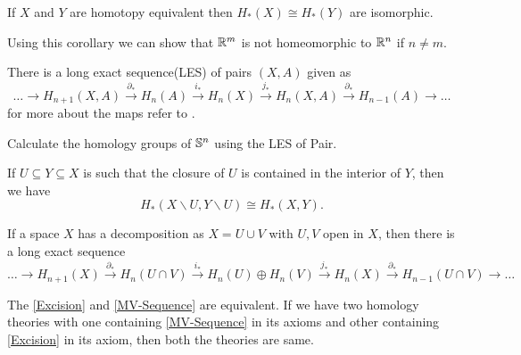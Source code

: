 \begin{corollary}
	If \(X\) and \(Y\) are homotopy equivalent then \(H_\ast(X) \cong H_\ast(Y)\) are isomorphic.
\end{corollary}
Using this corollary we can show that \(\mathbb{R}^{m}\) is not homeomorphic to \(\mathbb{R}^{n}\) if \(n \neq m\).

\begin{theorem}
	There is a long exact sequence(LES) of pairs \((X,A)\) given as 
	\[\dots \to H_{n+1}(X,A) \xrightarrow{\partial_\ast} H_n(A) \xrightarrow{i_\ast} H_n(X) \xrightarrow{j_\ast} H_n(X,A) \xrightarrow{\partial_\ast} H_{n-1}(A) \to \dots\]
	for more about the maps refer to \cite{Hatcher2002}.
\end{theorem}

\begin{exercise}
	Calculate the homology groups of \(\mathbb{S}^{n}\) using the LES of Pair. 
\end{exercise}

\begin{theorem}
	\label{Excision}
	If \(U \subseteq Y \subseteq X\) is such that the closure of \(U\) is contained in the interior of \(Y\), then we have 
	\[H_\ast(X\backslash U,Y \backslash U) \cong H_\ast(X,Y).\]
\end{theorem}

\begin{theorem}
	\label{MV-Sequence}
	If a space \(X\) has a decomposition as \(X = U \cup V\) with \(U, V\) open in \(X\), then there is a long exact sequence 
	\[\dots \to H_{n+1}(X) \xrightarrow{\partial_\ast} H_n(U\cap V) \xrightarrow{i_\ast} H_n(U) \oplus H_n(V) \xrightarrow{j_\ast} H_n(X) \xrightarrow{\partial_\ast} H_{n-1}(U\cap V) \to \dots\]
\end{theorem}

The \cref{Excision} and \cref{MV-Sequence} are equivalent.
If we have two homology theories with one containing \cref{MV-Sequence} in its axioms and other containing \cref{Excision} in its axiom, then both the theories are same.



